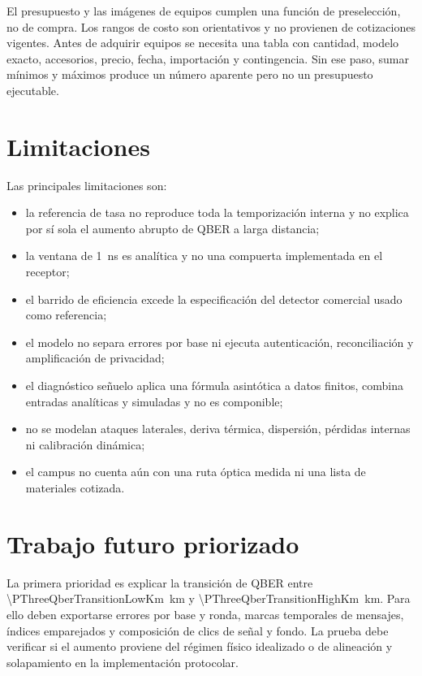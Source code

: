 El presupuesto y las imágenes de equipos cumplen una función de preselección, no de compra. Los rangos de costo son orientativos y no provienen de cotizaciones vigentes. Antes de adquirir equipos se necesita una tabla con cantidad, modelo exacto, accesorios, precio, fecha, importación y contingencia. Sin ese paso, sumar mínimos y máximos produce un número aparente pero no un presupuesto ejecutable.

\section{Limitaciones}

Las principales limitaciones son:

\begin{itemize}
  \item la referencia de tasa no reproduce toda la temporización interna y no explica por sí sola el aumento abrupto de QBER a larga distancia;
  \item la ventana de \SI{1}{\nano\second} es analítica y no una compuerta implementada en el receptor;
  \item el barrido de eficiencia excede la especificación del detector comercial usado como referencia;
  \item el modelo no separa errores por base ni ejecuta autenticación, reconciliación y amplificación de privacidad;
  \item el diagnóstico señuelo aplica una fórmula asintótica a datos finitos, combina entradas analíticas y simuladas y no es componible;
  \item no se modelan ataques laterales, deriva térmica, dispersión, pérdidas internas ni calibración dinámica;
  \item el campus no cuenta aún con una ruta óptica medida ni una lista de materiales cotizada.
\end{itemize}

\section{Trabajo futuro priorizado}

La primera prioridad es explicar la transición de QBER entre \SI[round-mode=places,round-precision=2]{\PThreeQberTransitionLowKm}{\kilo\meter} y \SI[round-mode=places,round-precision=2]{\PThreeQberTransitionHighKm}{\kilo\meter}. Para ello deben exportarse errores por base y ronda, marcas temporales de mensajes, índices emparejados y composición de clics de señal y fondo. La prueba debe verificar si el aumento proviene del régimen físico idealizado o de alineación y solapamiento en la implementación protocolar.

